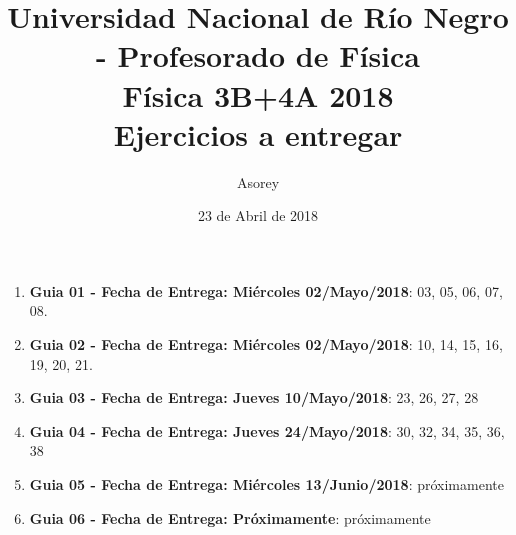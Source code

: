 \documentclass[a4paper,12pt]{article}
\begin{document}
\title{
{\normalsize{Universidad Nacional de Río Negro - Profesorado de Física}}\\
Física 3B+4A  2018 \\ Ejercicios a entregar}
\author{Asorey}
\date{23 de Abril de 2018}
\maketitle

\begin{enumerate}
	\item {\bf{Guia 01 - Fecha de Entrega: Miércoles 02/Mayo/2018}}: 03, 05, 06, 07, 08. 
	\item {\bf{Guia 02 - Fecha de Entrega: Miércoles 02/Mayo/2018}}: 10, 14, 15, 16, 19, 20, 21. 
	\item {\bf{Guia 03 - Fecha de Entrega: Jueves 10/Mayo/2018}}: 23, 26, 27, 28 
	\item {\bf{Guia 04 - Fecha de Entrega: Jueves 24/Mayo/2018}}: 30, 32, 34, 35, 36, 38
	\item {\bf{Guia 05 - Fecha de Entrega: Miércoles 13/Junio/2018}}: próximamente
	\item {\bf{Guia 06 - Fecha de Entrega: Próximamente}}: próximamente
\end{enumerate}
\end{document}
